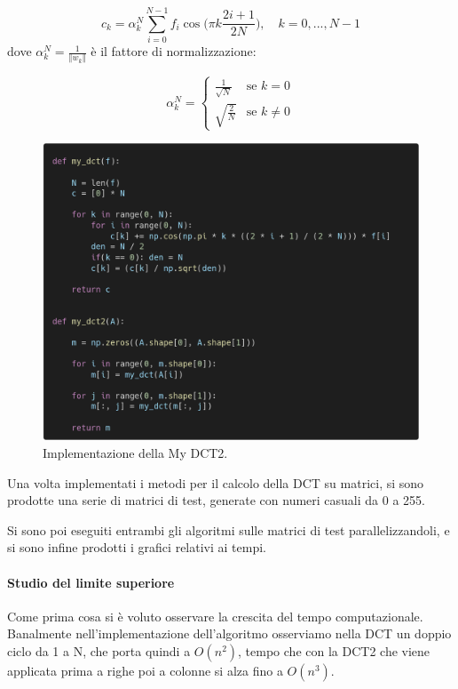 \documentclass[12pt]{article}
\begin{document}
\[
    c_k = \alpha_{k}^{N} \sum\limits_{i=0}^{N-1} f_i \cos \biggl(\pi k \dfrac{2i+1}{2N} \biggl), \quad k = 0, ..., N-1
\]
dove $\alpha_{k}^{N} = \frac{1}{\Vert w_k \Vert}$ è il fattore di normalizzazione:

\[
\alpha_{k}^{N}=
\begin{cases}
\frac{1}{\sqrt{N}} & \text{se } k=0 \\
\sqrt{\frac{2}{N}} & \text{se } k\neq0
\end{cases}
\]

\begin{figure}[!ht]
    \begin{center}
    \includegraphics[scale=0.3]{images/code_mydct.png}
    \caption{Implementazione della My DCT2.}
    \end{center}
\end{figure}

Una volta implementati i metodi per il calcolo della DCT su matrici, si sono prodotte una serie di matrici di test, generate con numeri casuali da 0 a 255.

Si sono poi eseguiti entrambi gli algoritmi sulle matrici di test parallelizzandoli, e si sono infine prodotti i grafici relativi ai tempi.

\paragraph{Studio del limite superiore}
Come prima cosa si è voluto osservare la crescita del tempo computazionale. Banalmente nell'implementazione dell'algoritmo osserviamo nella DCT un doppio ciclo da 1 a N, che porta quindi a $O(n^2)$, tempo che con la DCT2 che viene applicata prima a righe poi a colonne si alza fino a $O(n^3)$.
\end{document}
